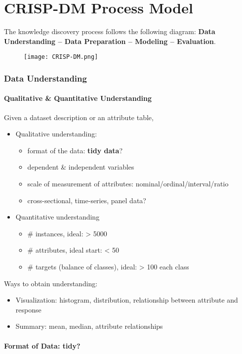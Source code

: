 \newpage
\part{CRISP-DM Process Model}
The knowledge discovery process follows the following diagram: \textbf{Data Understanding -- Data Preparation -- Modeling -- Evaluation}. 
\begin{figure}[H]
	\centering
	\texttt{[image: CRISP-DM.png]}
\end{figure}
\section{Data Understanding}
\subsection{Qualitative \& Quantitative Understanding}
Given a dataset description or an attribute table, 
\begin{itemize}
	\item Qualitative understanding:
	\begin{itemize}
		\item format of the data: \textbf{tidy data}?
		\item dependent \& independent variables
		\item scale of measurement of attributes: nominal/ordinal/interval/ratio
		\item cross-sectional, time-series, panel data?
	\end{itemize}
	\item Quantitative understanding
	\begin{itemize}
		\item \# instances, ideal: > 5000
		\item \# attributes, ideal start: < 50
		\item \# targets (balance of classes), ideal: > 100 each class
	\end{itemize}
\end{itemize} 
Ways to obtain understanding:
\begin{itemize}
	\item Visualization: histogram, distribution, relationship between attribute and response
	\item Summary: mean, median, attribute relationships
\end{itemize}

\subsection{Format of Data: tidy?}
